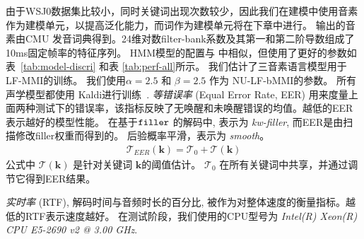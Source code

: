 由于WSJ0数据集比较小，同时关键词出现次数较少，因此我们在建模中使用音素作为建模单元，以提高泛化能力，而词作为建模单元将在下章中进行。
输出的音素由CMU 发音词典得到。24维对数filter-bank系数及其第一和第二阶导数组成了10ms固定帧率的特征序列。
HMM模型的配置与 \cite{povey2016purely}中相似，但使用了更好的参数如表~\ref{tab:model-discri} 和表 \ref{tab:perf-all}所示。 我们估计了三音素语言模型用于LF-MMI的训练。
我们使用$\alpha=2.5$ 和 $\beta=2.5$ 作为 NU-LF-bMMI的参数。
所有声学模型都使用 Kaldi进行训练~\cite{povey2011kaldi}.
 {\em 等错误率} (Equal Error Rate, EER) 用来度量上面两种测试下的错误率，该指标反映了无唤醒和未唤醒错误的均值。越低的EER表示越好的模型性能。
在基于$\tt filler$ 的解码中, 表示为 {\em{kw-filler}}, 而EER是由扫描修改filler权重而得到的。
后验概率平滑，表示为 {\em{smooth}}。
\begin{equation}
\label{equ:eer-thres}
\begin{split}
\mathcal T_{EER}(\mathbf{k})=\mathcal T_0+\mathcal T(\mathbf{k})
\end{split}
\end{equation}
公式中 $\mathcal T(\mathbf{k})$ 是针对关键词 $\mathbf{k}$的阈值估计。 $\mathcal T_0$ 在所有关键词中共享，并通过调节它得到EER结果。

{\em 实时率} (RTF), 解码时间与音频时长的百分比, 被作为对整体速度的衡量指标。越低的RTF表示速度越好。
在测试阶段，我们使用的CPU型号为
{\em{Intel(R) Xeon(R) CPU E5-2690 v2 @ 3.00 GHz}}. 


